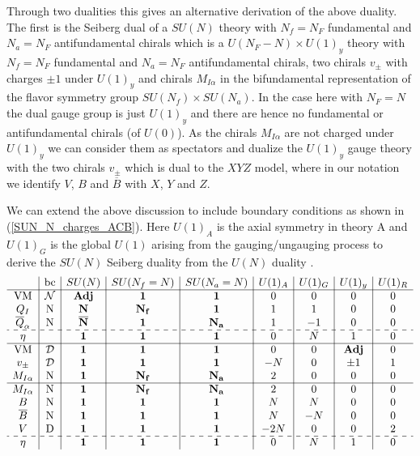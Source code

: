 \documentclass[12pt]{article}
\numberwithin{equation}{section}
\begin{document}
Through two dualities this gives an alternative derivation of the above duality. 
The first is the Seiberg dual of a $SU(N)$ theory with $N_f = N_F$ fundamental and $N_a = N_F$ antifundamental chirals which is a $U(N_F - N) \times U(1)_y$ theory with $N_f = N_F$ fundamental and $N_a = N_F$ antifundamental chirals, two chirals $v_{\pm}$ with charges $\pm 1$ under $U(1)_y$ and chirals $M_{I \alpha}$ in the bifundamental representation of the flavor symmetry group $SU(N_f) \times SU(N_a)$. In the case here with $N_F = N$ the dual gauge group is just $U(1)_y$ and there are hence no fundamental or antifundamental chirals (of $U(0)$). As the chirals $M_{I \alpha}$ are not charged under $U(1)_y$ we can consider them as spectators and dualize the $U(1)_y$ gauge theory with the two chirals $v_{\pm}$ which is dual to the $XYZ$ model, where in our notation we identify $V$, $B$ and $\overline{B}$ with $X$, $Y$ and $Z$.

We can extend the above discussion to include boundary conditions as shown in (\ref{SUN_N_charges_ACB}). Here $U(1)_A$ is the axial symmetry in theory A and $U(1)_G$ is the global $U(1)$ arising from the gauging/ungauging process to derive the $SU(N)$ Seiberg duality from the $U(N)$ duality \cite{Aharony:2013dha, Park:2013wta}. 
\begin{align}
\label{SUN_N_charges_ACB}
\begin{array}{c|c|c|c|c|c|c|c|c}
& \textrm{bc} & SU(N) & SU(N_f = N) & SU(N_a = N) & U(1)_A & U(1)_G & U(1)_y & U(1)_R \\ \hline
\textrm{VM} & \mathcal{N} & {\bf Adj} & {\bf 1} & {\bf 1} & 0 & 0 & 0 & 0 \\
Q_I & \textrm{N} & {\bf N} & {\bf N_f} & {\bf 1} & 1 & 1 & 0 & 0 \\
\overline{Q}_{\alpha} & \textrm{N} & {\bf \overline{N}} & {\bf 1} & {\bf N_a} & 1 & -1 & 0 & 0 \\
\hdashline
\eta & & {\bf 1} & {\bf 1} & {\bf 1} & 0 & N & 1 & 0 \\
 \hline
 \textrm{VM} & \mathcal{D} & {\bf 1} & {\bf 1} & {\bf 1} & 0 & 0 & {\bf Adj} & 0 \\
 v_{\pm} & \mathcal{D} & {\bf 1} & {\bf 1} & {\bf 1} & -N & 0 & \pm 1 & 1 \\
M_{I \alpha} & \textrm{N} & {\bf 1} & {\bf N_f} & {\bf N_a} & 2 & 0 & 0 & 0 \\
\hline
M_{I \alpha} & \textrm{N} & {\bf 1} & {\bf N_f} & {\bf N_a} & 2 & 0 & 0 & 0 \\
B & \textrm{N} & {\bf 1} & {\bf 1} & {\bf 1} & N & N & 0 & 0 \\
\overline{B} & \textrm{N} & {\bf 1} & {\bf 1} & {\bf 1} & N & -N & 0 & 0 \\
V & \textrm{D} & {\bf 1} & {\bf 1} & {\bf 1} & -2N & 0 & 0 & 2 \\
\hdashline
\eta & & {\bf 1} & {\bf 1} & {\bf 1} & 0 & N & 1 & 0
\end{array}
\end{align}
\end{document}
